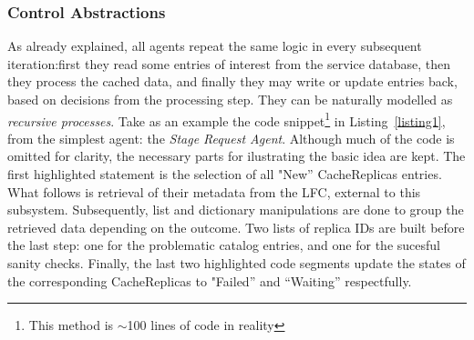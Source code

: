 \documentclass[10pt,conference]{IEEEtran}
\begin{document}
\subsubsection{Control Abstractions}
As already explained, all agents repeat the same logic in every subsequent iteration:first they
read some entries of interest from the service database, then they process the cached data, and finally
they may write or update entries back, based on decisions from the processing step.
They can be naturally modelled as \textit{recursive processes}.
Take as an example the code snippet\footnote{This method is $\sim$100 lines of code in reality} 
in Listing~\ref{listing1}, 
from the simplest agent: the \textit{Stage Request Agent}. 
Although much of the code is omitted for clarity, the necessary parts for
ilustrating the basic idea are kept.
The first highlighted statement is the selection of all "New'' CacheReplicas
entries. What follows is retrieval of their metadata from the LFC,
external to this subsystem. Subsequently, list and dictionary manipulations
are done to group the retrieved data depending on the outcome.
Two lists of replica IDs are built before the last step: one for the problematic catalog entries,
and one for the sucesful sanity checks.
Finally, the last two highlighted code segments update the states 
of the corresponding CacheReplicas to "Failed'' and ``Waiting'' respectfully.


\end{document}
